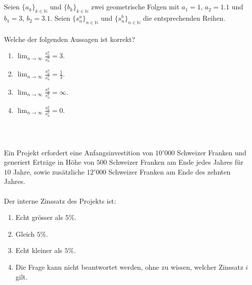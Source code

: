 \subsection*{}
Seien $\{a_k\}_{k \in \mathbb{N}}$ und $\{b_k\}_{k \in \mathbb{N}}$ zwei geometrische Folgen mit $a_1 = 1$, $a_2= 1.1$ und $b_1 = 3$, $b_2 = 3.1$.
Seien $\{s_n^a \}_{n \in \mathbb{N}}$ und $\{s_n^b \}_{n \in \mathbb{N}}$ die entsprechenden Reihen.\\
\\
Welche der folgenden Aussagen ist korrekt? 
\renewcommand{\labelenumi}{(\alph{enumi})}
\begin{enumerate}
	\item 
	$\lim_{n \to \infty} \frac{s_n^a}{s_n^b} = 3$.
	\item
	$\lim_{n \to \infty} \frac{s_n^a}{s_n^b} = \frac{1}{3}$.
	\item
	$\lim_{n \to \infty} \frac{s_n^a}{s_n^b} = \infty$.
	\item
	$\lim_{n \to \infty} \frac{s_n^a}{s_n^b} = 0$.
\end{enumerate}
\ \\
\subsection*{}
Ein Projekt erfordert eine Anfangsinvestition von $10'000$ Schweizer Franken und generiert Erträge in Höhe von $500$ Schweizer Franken am Ende jedes Jahres für $10$ Jahre, sowie zusätzliche $12'000$ Schweizer Franken am Ende des zehnten Jahres.\\
\\
Der interne Zinssatz des Projekts ist:
\renewcommand{\labelenumi}{(\alph{enumi})}
\begin{enumerate}
	\item 
	Echt grösser als $5 \%$.
	\item 
	Gleich $5 \%$.
	\item
	Echt kleiner als $5 \%$.
	\item
	Die Frage kann nicht beantwortet werden, ohne zu wissen, welcher Zinssatz $i$ gilt.
\end{enumerate}
\ \\
